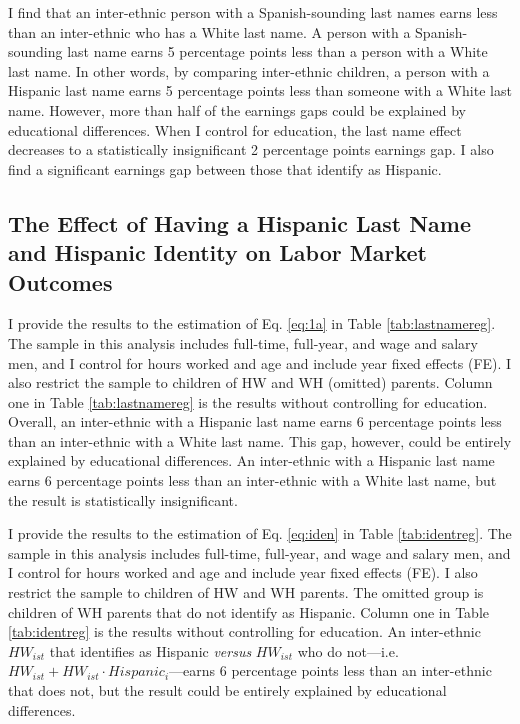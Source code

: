 \documentclass[a4paper,fleqn]{cas-sc}
\begin{document}
I find that an inter-ethnic person with a Spanish-sounding last names earns less than an inter-ethnic who has a White last name. A person with a Spanish-sounding last name earns 5 percentage points less than a person with a White last name. In other words, by comparing inter-ethnic children, a person with a Hispanic last name earns 5 percentage points less than someone with a White last name. However, more than half of the earnings gaps could be explained by educational differences. When I control for education, the last name effect decreases to a statistically insignificant 2 percentage points earnings gap. I also find a significant earnings gap between those that identify as Hispanic.

\subsection{The Effect of Having a Hispanic Last Name and Hispanic Identity on Labor Market Outcomes}

I provide the results to the estimation of Eq. \eqref{eq:1a} in Table \ref{tab:lastnamereg}. The sample in this analysis includes full-time, full-year, and wage and salary men, and I control for hours worked and age and include year fixed effects (FE). I also restrict the sample to children of HW and WH (omitted) parents. Column one in Table \ref{tab:lastnamereg} is the results without controlling for education. Overall, an inter-ethnic with a Hispanic last name earns 6 percentage points less than an inter-ethnic with a White last name. This gap, however, could be entirely explained by educational differences. An inter-ethnic with a Hispanic last name earns 6 percentage points less than an inter-ethnic with a White last name, but the result is statistically insignificant.

I provide the results to the estimation of Eq. \eqref{eq:iden} in Table \ref{tab:identreg}. The sample in this analysis includes full-time, full-year, and wage and salary men, and I control for hours worked and age and include year fixed effects (FE). I also restrict the sample to children of HW and WH parents. The omitted group is children of WH parents that do not identify as Hispanic. Column one in Table \ref{tab:identreg} is the results without controlling for education. An inter-ethnic $HW_{ist}$ that identifies as Hispanic \textit{versus} $HW_{ist}$ who do not---i.e. $HW_{ist} + HW_{ist} \cdot Hispanic_i$---earns 6 percentage points less than an inter-ethnic that does not, but the result could be entirely explained by educational differences.
\end{document}
